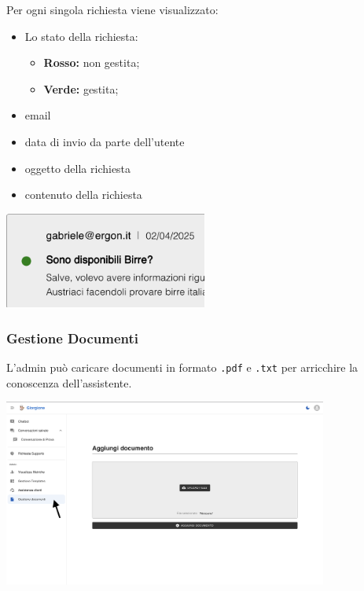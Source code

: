 Per ogni singola richiesta viene visualizzato:
\begin{itemize}
    \item Lo stato della richiesta:
    \begin{itemize}
        \item \textbf{Rosso:} non gestita;
        \item \textbf{Verde:} gestita;
    \end{itemize}
    \item email
    \item data di invio da parte dell'utente
    \item oggetto della richiesta
    \item contenuto della richiesta
\end{itemize}
\begin{center}
    \includegraphics[width=0.5\textwidth]{./img/Assistenza2.png}
\end{center}

\newpage

\subsubsection{Gestione Documenti}
L'admin può caricare documenti in formato \texttt{.pdf} e \texttt{.txt} per arricchire la conoscenza dell'assistente.
\begin{center}
    \includegraphics[width=0.8\textwidth]{./img/PaginaGestioneDocumenti1.png}
    \label{fig:gestione1}
\end{center}

